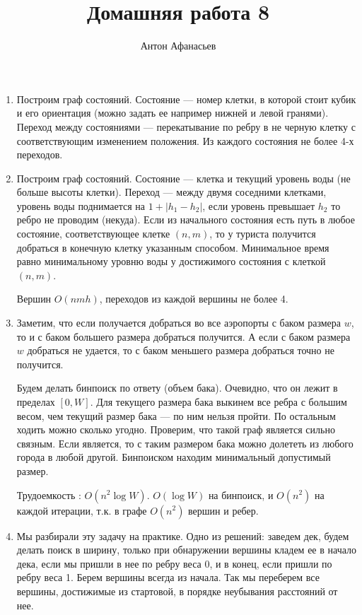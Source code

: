 \documentclass[10pt]{article}
\begin{document}
\title{Домашняя работа 8}
\author{Антон Афанасьев}
\maketitle

\begin{enumerate}
\item Построим граф состояний. Состояние --- номер клетки, в которой стоит кубик и его ориентация (можно задать ее например нижней и левой гранями). Переход между состояниями --- перекатывание по ребру в не черную клетку с соответствующим изменением положения. Из каждого состояния не более 4-х переходов.

\item Построим граф состояний. Состояние --- клетка и текущий уровень воды (не больше высоты клетки). Переход --- между двумя соседними клетками, уровень воды поднимается на $1+|h_1 - h_2|$, если уровень превышает $h_2$ то ребро не проводим (некуда). Если из начального состояния есть путь в любое состояние, соответствующее клетке $(n, m)$, то у туриста получится добраться в конечную клетку указанным способом. Минимальное время равно минимальному уровню воды у достижимого состояния с клеткой $(n, m)$.

Вершин $O(nmh)$, переходов из каждой вершины не более 4.

\item Заметим, что если получается добраться во все аэропорты с баком размера $w$, то и с баком большего размера добраться получится. А если с баком размера $w$ добраться не удается, то с баком меньшего размера добраться точно не получится.

Будем делать бинпоиск по ответу (объем бака). Очевидно, что он лежит в пределах $[0, W]$. Для текущего размера бака выкинем все ребра с большим весом, чем текущий размер бака --- по ним нельзя пройти. По остальным ходить можно сколько угодно. Проверим, что такой граф является сильно связным. Если является, то с таким размером бака можно долететь из любого города в любой другой. Бинпоиском находим минимальный допустимый размер.

Трудоемкость : $O(n^2 \log W)$. $O(\log W)$ на бинпоиск, и $O(n^2)$ на  каждой итерации, т.к. в графе $O(n^2)$ вершин и ребер.

\item Мы разбирали эту задачу на практике. Одно из решений: заведем дек, будем делать поиск в ширину, только при обнаружении вершины кладем ее в начало дека, если мы пришли в нее по ребру веса 0, и в конец, если пришли по ребру веса 1. Берем вершины всегда из начала. Так мы переберем все вершины, достижимые из стартовой, в порядке неубывания расстояний от нее.


\end{enumerate}
\end{document}
